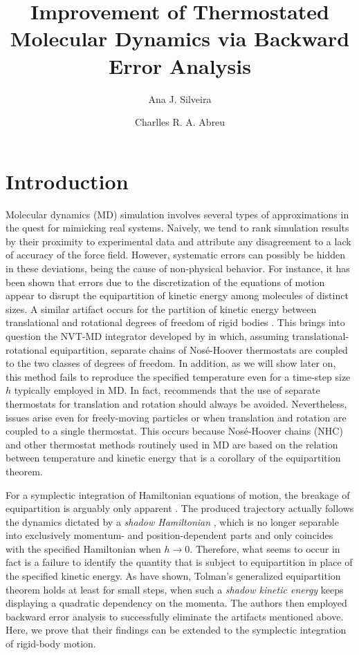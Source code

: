\documentclass[
journal=jctcce,
layout=twocolumn
]{achemso}
\author{Ana J. Silveira}
\affiliation{Planta Piloto de Ingenier\'ia Qu\'imica, PLAPIQUI, Universidad Nacional del Sur, Camino La Carrindanga Km 7-CC: 717, Bah\'ia Blanca, Argentina}
\author{Charlles R. A. Abreu}
\affiliation{Chemical Engineering Department, Escola de Qu\'imica, Universidade Federal do Rio de Janeiro, Rio de Janeiro, RJ 21941-909, Brazil}
\title{Improvement of Thermostated Molecular Dynamics via Backward Error Analysis}
\newcommand{\timestep}{h}
\begin{document}


\section{Introduction}

Molecular dynamics (MD) simulation involves several types of approximations in the quest for mimicking real systems.
Naively, we tend to rank simulation results by their proximity to experimental data and attribute any disagreement to a lack of accuracy of the force field.
However, systematic errors can possibly be hidden in these deviations, being the cause of non-physical behavior.
For instance, it has been shown \cite{Eastwood_2010} that errors due to the discretization of the equations of motion appear to disrupt the equipartition of kinetic energy among molecules of distinct sizes.
A similar artifact occurs for the partition of kinetic energy between translational and rotational degrees of freedom of rigid bodies \cite{Davidchack_2010, Silveira_2017}.
This brings into question the NVT-MD integrator developed by \citeauthor{Kamberaj_2005} \cite{Kamberaj_2005} in which, assuming translational-rotational equipartition, separate chains of Nos\'{e}-Hoover thermostats are coupled to the two classes of degrees of freedom.
In addition, as we will show later on, this method fails to reproduce the specified temperature even for a time-step size $\timestep$ typically employed in MD.
In fact, \citeauthor{Davidchack_2010} \cite{Davidchack_2010} recommends that the use of separate thermostats for translation and rotation should always be avoided.
Nevertheless, issues arise even for freely-moving particles or when translation and rotation are coupled to a single thermostat.
This occurs because Nos\'{e}-Hoover chains (NHC) \cite{Martyna_1992} and other thermostat methods routinely used in MD are based on the relation between temperature and kinetic energy that is a corollary of the equipartition theorem.

For a symplectic integration of Hamiltonian equations of motion, the breakage of equipartition is arguably only apparent \cite{Eastwood_2010}.
The produced trajectory actually follows the dynamics dictated by a \textit{shadow Hamiltonian} \cite{Tuckerman_2010}, which is no longer separable into exclusively momentum- and position-dependent parts and only coincides with the specified Hamiltonian when $\timestep \to 0$.
Therefore, what seems to occur in fact is a failure to identify the quantity that is subject to equipartition in place of the specified kinetic energy.
As \citeauthor{Eastwood_2010} \cite{Eastwood_2010} have shown, Tolman's generalized equipartition theorem \cite{Tolman_1918, Uline_2008} holds at least for small steps, when such a \textit{shadow kinetic energy} keeps displaying a quadratic dependency on the momenta.
The authors then employed backward error analysis to successfully eliminate the artifacts mentioned above.
Here, we prove that their findings can be extended to the symplectic integration of rigid-body motion.
\end{document}
